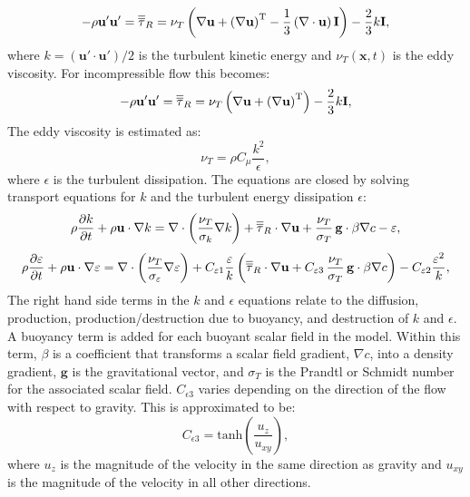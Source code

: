 \begin{equation}\label{eq:R_tensor_compressible}
 -\rho\mathbf{u}'\mathbf{u}' = \overline{\overline{\tau}}_R = \nu_T \left( \nabla\mathbf{u} + \left(\nabla\mathbf{u}\right)^{\mathrm{T}} - \frac{1}{3}\left(\nabla\cdot\mathbf{u}\right)\mathbf{I} \right) - \frac{2}{3} k\mathbf{I},
\end{equation}
where $k=(\mathbf{u}'\cdot\mathbf{u}')/2$ is the turbulent kinetic energy and $\nu_T(\mathbf{x},t)$ is the eddy viscosity. For incompressible flow this becomes:
\begin{equation}\label{eq:R_tensor_incompressible}
 -\rho\mathbf{u}'\mathbf{u}' = \overline{\overline{\tau}}_R = \nu_T \left( \nabla\mathbf{u} + \left(\nabla\mathbf{u}\right)^{\mathrm{T}} \right) - \frac{2}{3} k\mathbf{I},
\end{equation}
The eddy viscosity is estimated as:
\begin{equation}\label{eq:nut}
 \nu_T = \rho C_\mu \frac{k^2}{\epsilon},
\end{equation}
where $\epsilon$ is the turbulent dissipation. The equations are closed by solving transport equations for $k$ and the turbulent energy dissipation $\epsilon$:
\begin{equation}\label{eq:k}
\rho\frac{\partial k}{\partial t} + \rho\mathbf{u}\cdot\nabla k = \nabla\cdot\left(\frac{\nu_T}{\sigma_k} \nabla k \right) + \overline{\overline{\tau}}_R \cdot \nabla\mathbf{u} + \frac{\nu_T}{\sigma_T} \, \mathbf{g}\cdot \beta \nabla c - \varepsilon,
\end{equation}
\begin{equation}\label{eq:eps}
\rho\frac{\partial \varepsilon}{\partial t} + \rho\mathbf{u}\cdot\nabla \varepsilon = \nabla\cdot\left(\frac{\nu_T}{\sigma_\varepsilon} \nabla{\varepsilon} \right) + C_{\varepsilon1} \frac{\varepsilon}{k} \left( \overline{\overline{\tau}}_R \cdot \nabla\mathbf{u} + C_{\varepsilon3} \, \frac{\nu_T}{\sigma_T} \, \mathbf{g}\cdot \beta \nabla c \right)- C_{\varepsilon2} \frac{\varepsilon^2}{k},
\end{equation}
The right hand side terms in the $k$ and $\epsilon$ equations relate to the diffusion, production, production/destruction due to buoyancy, and destruction of $k$ and $\epsilon$. A buoyancy term is added for each buoyant scalar field in the model. Within this term, $\beta$ is a coefficient that transforms a scalar field gradient, $\nabla c$, into a density gradient, $\mathbf{g}$ is the gravitational vector, and $\sigma_T$ is the Prandtl or Schmidt number for the associated scalar field. $C_{\epsilon3}$ varies depending on the direction of the flow with respect to gravity. This is approximated to be:
\begin{equation}\label{eq:Cepsilon3}
C_{\epsilon3} = \mathrm{tanh}\left ( \frac{u_z}{u_{xy}}  \right ),
\end{equation}
where $u_z$ is the magnitude of the velocity in the same direction as gravity and $u_{xy}$ is the magnitude of the velocity in all other directions.

